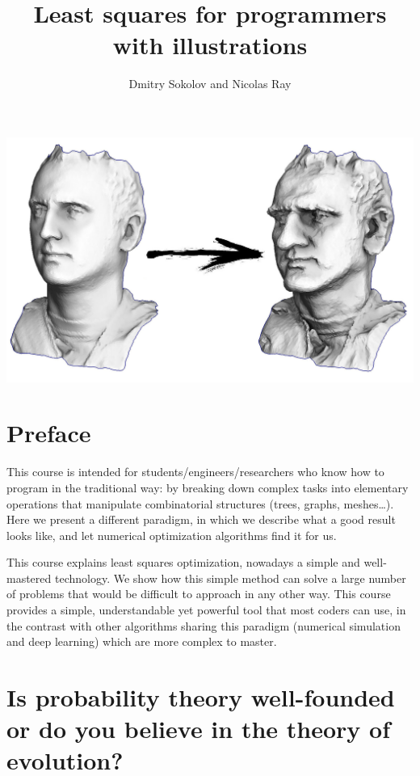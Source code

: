 \documentclass[notitlepage]{report}
\title{{\Huge Least squares for programmers}\\
{\large with illustrations}\\
\vspace{20mm}}
\author{Dmitry Sokolov and Nicolas Ray}
\date{}
\makeatletter
\newcommand*{\toccontents}{\@starttoc{toc}}
\makeatother
\begin{document}
\maketitle

\vspace{10mm}

\toccontents

\vspace{10mm}
\begin{center}
\includegraphics[width=.8\linewidth]{caricature.jpg}
\end{center}


\chapter*{Preface}

This course is intended for students/engineers/researchers who know how to program in the traditional way:
by breaking down complex tasks into elementary operations that manipulate combinatorial structures (trees, graphs, meshes\dots).
Here we present a different paradigm, in which we describe what a good result looks like, and let numerical optimization algorithms find it for us.

This course explains least squares optimization, nowadays a simple and well-mastered technology.
We show how this simple method can solve a large number of problems that would be difficult to approach in any other way.
This course provides a simple, understandable yet powerful tool that most coders can use,
in the contrast with other algorithms sharing this paradigm (numerical simulation and deep learning) which are more complex to master.

\chapter{Is probability theory well-founded or do you believe in the theory of evolution?}
\end{document}
